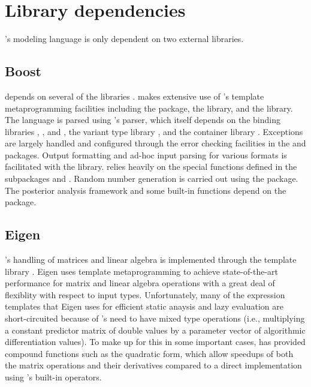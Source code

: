 \documentclass[article]{jss}
\begin{document}
\section{Library dependencies}

's modeling language is only dependent on two external
libraries.  

\subsection{Boost} 

 depends on several of the  
libraries \citep{Boost:2011}.   makes extensive use of
's template metaprogramming facilities including the
 package, the  library, and the
 library.  The  language is parsed
using 's  parser, which itself depends on
the binding libraries , , and ,
the variant type library , and the container library
.  Exceptions are largely handled and configured through
the error checking facilities in the  and
 packages.  Output formatting and ad-hoc input parsing
for various formats is facilitated with the  library.
 relies heavily on the special functions defined in the
 subpackages  and .  Random number generation is carried out using the
 package.  The posterior analysis framework and some
built-in functions depend on the  package.

\subsection{Eigen}

's handling of matrices and linear algebra is
implemented through the   template library
\citep{Eigen:2012}.  Eigen uses template metaprogramming to achieve
state-of-the-art performance for matrix and linear algebra operations
with a great deal of flexiblity with respect to input types.
Unfortunately, many of the expression templates that Eigen uses for
efficient static anaysis and lazy evaluation are short-circuited
because of 's need to have mixed type operations (i.e.,
multiplying a constant predictor matrix of double values by a
parameter vector of algorithmic differentiation values).  To make up for
this in some important cases,  has provided compound
functions such as the quadratic form, which allow speedups of both the
matrix operations and their derivatives compared to a direct
implementation using 's built-in operators.
\end{document}
